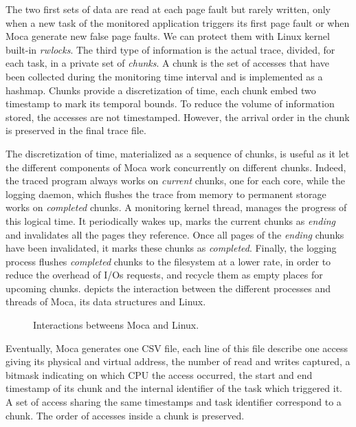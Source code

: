 The two first sets of data are read at each page fault but rarely written, only when a new task of the monitored application triggers its first page fault or when \gls{Moca} generate new false page faults.
We can protect them with Linux kernel built-in \emph{rwlocks}.
The third type of information is the actual trace, divided, for each task, in a private set of \emph{chunks}.
A chunk is the set of accesses that have been collected during the monitoring time interval and is implemented as a hashmap.
Chunks provide a discretization of time, each chunk embed two timestamp to mark its temporal bounds.
To reduce the volume of information stored, the accesses are not timestamped.
However, the arrival order in the chunk is preserved in the final trace file.

The discretization of time, materialized as a sequence of chunks, is useful as it let the different components of \gls{Moca} work concurrently on different chunks.
Indeed, the traced program always works on \emph{current} chunks, one for each core, while the logging daemon, which flushes the trace from memory to permanent storage works on \emph{completed} chunks.
A monitoring kernel thread, manages the progress of this logical time.
It periodically wakes up, marks the current chunks as \emph{ending} and invalidates all the pages they reference.
Once all pages of the \emph{ending} chunks have been invalidated, it marks these chunks as \emph{completed}.
Finally, the logging process flushes \emph{completed} chunks to the filesystem at a lower rate, in order to reduce the overhead of I/Os requests, and recycle them as empty places for upcoming chunks.
  depicts the interaction between the different processes and threads of \gls{Moca}, its data structures and Linux.

\begin{figure}[htb]
    \centering
    
    \caption{Interactions betweens Moca and Linux.}
    \label{fig:moca}
\end{figure}

Eventually, \gls{Moca} generates one \gls{CSV} file, each line of this file describe one access giving its physical and virtual address, the number of read and writes captured, a bitmask indicating on which CPU the access occurred, the start and end timestamp of its chunk and the internal identifier of the task which triggered it.
A set of access sharing the same timestamps and task identifier correspond to a chunk.
The order of accesses inside a chunk is preserved.

